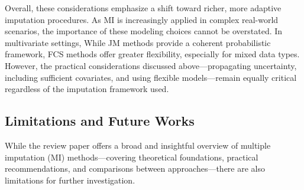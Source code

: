 \documentclass[12pt,oneside]{amsart}
\theoremstyle{definition}
\theoremstyle{remark}
\numberwithin{equation}{section}
\begin{document}
Overall, these considerations emphasize a shift toward richer, more adaptive imputation procedures. As MI is increasingly applied in complex real-world scenarios, the importance of these modeling choices cannot be overstated. In multivariate settings, While JM methods provide a coherent probabilistic framework, FCS methods offer greater flexibility, especially for mixed data types. However, the practical considerations discussed above—propagating uncertainty, including sufficient covariates, and using flexible models—remain equally critical regardless of the imputation framework used.


\subsection{Limitations and Future Works}
While the review paper offers a broad and insightful overview of multiple imputation (MI) methods—covering theoretical foundations, practical recommendations, and comparisons between approaches—there are also limitations for further investigation.
\end{document}
